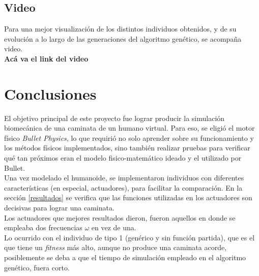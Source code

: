 \documentclass{article}
\begin{document}
\subsection{Video}
Para una mejor visualizaci\'on de los distintos individuos obtenidos, y de su evoluci\'on a lo largo de las generaciones del algoritmo gen\'etico, se acompa\~na video.\\
\textbf{Ac\'a va el link del video}



\section{Conclusiones}
El objetivo principal de este proyecto fue lograr producir la simulaci\'on biomec\'anica de una caminata de un humano virtual. Para eso, se eligi\'o el motor f\'isico \textit{Bullet Physics}, lo que requiri\'o no solo aprender sobre su funcionamiento y los m\'etodos f\'isicos implementados, sino tambi\'en realizar pruebas para verificar qu\'e tan pr\'oximos eran el modelo fisico-matem\'atico ideado y el utilizado por Bullet.\\ %
Una vez modelado el humanoide, se implementaron individuos con diferentes caracter\'isticas (en especial, actuadores), para facilitar la comparaci\'on. En la secci\'on \ref{resultados} se verifica que las funciones utilizadas en los actuadores son decisivas para lograr una caminata.\\
Los actuadores que mejores resultados dieron, fueron aquellos en donde se empleaba dos frecuencias $\omega$ en vez de una.\\
Lo ocurrido con el individuo de tipo 1 (gen\'erico y sin funci\'on partida), que es el que tiene un \textit{fitness} m\'as alto, aunque no produce una caminata acorde, posiblemente se deba a que el tiempo de simulaci\'on empleado en el algoritmo gen\'etico, fuera corto.\\
\end{document}
